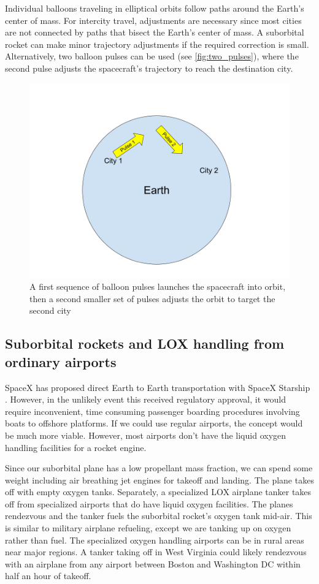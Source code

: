 \documentclass{article}
\begin{document}
Individual balloons traveling in elliptical orbits follow paths around the Earth’s center of mass. For intercity travel, adjustments are necessary since most cities are not connected by paths that bisect the Earth’s center of mass. A suborbital rocket can make minor trajectory adjustments if the required correction is small. Alternatively, two balloon pulses can be used (see \autoref{fig:two_pulses}), where the second pulse adjusts the spacecraft’s trajectory to reach the destination city.

\begin{figure}
    \centering
    \includegraphics[width=0.5\linewidth]{images/Two Pulses.png}
    \caption{A first sequence of balloon pulses launches the spacecraft into orbit, then a second smaller set of pulses adjusts the orbit to target the second city}
    \label{fig:two_pulses}
\end{figure}


\subsection{Suborbital rockets and LOX handling from ordinary airports}\label{sec:suborbital_airports}
SpaceX has proposed direct Earth to Earth transportation with SpaceX Starship \cite{spacex_earth_earth}.   However, in the unlikely event this received regulatory approval, it would require inconvenient, time consuming passenger boarding procedures involving boats to offshore platforms.   If we could use regular airports, the concept would be much more viable.    However, most airports don't have the liquid oxygen handling facilities for a rocket engine.

Since our suborbital plane has a low propellant mass fraction, we can spend some weight including air breathing jet engines for takeoff and landing.   The plane takes off with empty oxygen tanks.   Separately, a specialized LOX airplane tanker takes off from specialized airports that do have liquid oxygen facilities.    The planes rendezvous and the tanker fuels the suborbital rocket's oxygen tank mid-air.   This is similar to military airplane refueling, except we are tanking up on oxygen rather than fuel.   The specialized oxygen handling airports can be in rural areas near major regions.   A tanker taking off in West Virginia could likely rendezvous with an airplane from any airport between Boston and Washington DC within half an hour of takeoff.   
\end{document}
